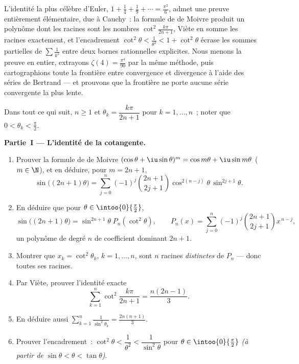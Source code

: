 L'identité la plus célèbre d'Euler, $1 + \frac14 + \frac19 + \cdots =
\frac{\pi^2}6$, admet une preuve entièrement élémentaire, due à
Cauchy~: la formule de de Moivre produit un polynôme dont les racines
sont les nombres $\cot^2\frac{k\pi}{2n+1}$, Viète en somme les
racines exactement, et l'encadrement $\cot^2\theta < \frac{1}{\theta^2}
< 1 + \cot^2\theta$ écrase les sommes partielles de $\sum\frac1{k^2}$
entre deux bornes rationnelles explicites. Nous menons la preuve en
entier, extrayons $\zeta(4) = \frac{\pi^4}{90}$ par la même méthode,
puis cartographions toute la frontière entre convergence et
divergence à l'aide des séries de Bertrand --- et prouvons que la
frontière ne porte aucune série convergente la plus lente.

\begin{problem}[{Problème du week-end --- $\zeta(2) = \pi^2/6$ et le
panorama de Bertrand}]
\label{pb:b2:series:1}
Dans tout ce qui suit, $n \geq 1$ et $\theta_k = \dfrac{k\pi}{2n+1}$
pour $k = 1, \dots, n$~; noter que $0 < \theta_k < \frac\pi2$.

\medskip
\noindent\textbf{Partie~I --- L'identité de la cotangente.}
\begin{enumerate}
  \item Prouver la formule de de Moivre $(\cos\theta +
        \iu\sin\theta)^m = \cos m\theta + \iu\sin m\theta$ ($m
        \in \N$), et en déduire, pour $m = 2n + 1$,
        \[
        \sin\bigl((2n{+}1)\theta\bigr) = \sum_{j=0}^{n}
        (-1)^j\binom{2n+1}{2j+1}\cos^{2(n-j)}\theta\,
        \sin^{2j+1}\theta .
        \]
  \item En déduire que pour $\theta \in \intoo{0}{\frac\pi2}$,
        \[
        \sin\bigl((2n{+}1)\theta\bigr) =
        \sin^{2n+1}\theta\; P_n(\cot^2\theta),
        \qquad
        P_n(x) = \sum_{j=0}^{n}
        (-1)^j\binom{2n+1}{2j+1}x^{\,n-j},
        \]
        un polynôme de degré $n$ de coefficient dominant $2n + 1$.
  \item Montrer que $x_k = \cot^2\theta_k$, $k = 1, \dots, n$, sont
        $n$ racines \emph{distinctes} de $P_n$ --- donc toutes ses
        racines.
  \item Par Viète, prouver l'identité exacte
        \[
        \sum_{k=1}^{n} \cot^2\frac{k\pi}{2n+1}
        = \frac{n(2n-1)}{3}.
        \]
  \item En déduire aussi $\displaystyle\sum_{k=1}^{n}
        \frac{1}{\sin^2\theta_k} = \frac{2n(n+1)}{3}$.
  \item Prouver l'encadrement~: $\cot^2\theta < \dfrac1{\theta^2} <
        \dfrac{1}{\sin^2\theta}$ pour $\theta \in
        \intoo{0}{\frac\pi2}$ \emph{(à partir de $\sin\theta < \theta
        < \tan\theta$)}.
\end{enumerate}


\end{problem}
